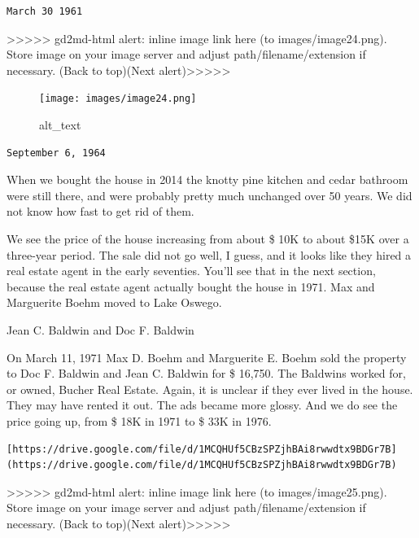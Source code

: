 \documentclass[
  12pt,
]{book}
\begin{document}
\begin{verbatim}
March 30 1961
\end{verbatim}

{\textgreater\textgreater\textgreater\textgreater\textgreater{} gd2md-html alert: inline image link here (to images/image24.png). Store image on your image server and adjust path/filename/extension if necessary. }(Back to top)(Next alert){\textgreater\textgreater\textgreater\textgreater\textgreater{} }

\begin{figure}
\centering
\texttt{[image: images/image24.png]}
\caption{alt\_text}
\end{figure}

\begin{verbatim}
September 6, 1964
\end{verbatim}

When we bought the house in 2014 the knotty pine kitchen and cedar bathroom were still there, and were probably pretty much unchanged over 50 years. We did not know how fast to get rid of them.

We see the price of the house increasing from about \$ 10K to about \$15K over a three-year period. The sale did not go well, I guess, and it looks like they hired a real estate agent in the early seventies. You'll see that in the next section, because the real estate agent actually bought the house in 1971. Max and Marguerite Boehm moved to Lake Oswego.

Jean C. Baldwin and Doc F. Baldwin

On March 11, 1971 Max D. Boehm and Marguerite E. Boehm sold the property to Doc F. Baldwin and Jean C. Baldwin for \$ 16,750. The Baldwins worked for, or owned, Bucher Real Estate. Again, it is unclear if they ever lived in the house. They may have rented it out. The ads became more glossy. And we do see the price going up, from \$ 18K in 1971 to \$ 33K in 1976.

\begin{verbatim}
[https://drive.google.com/file/d/1MCQHUf5CBzSPZjhBAi8rwwdtx9BDGr7B](https://drive.google.com/file/d/1MCQHUf5CBzSPZjhBAi8rwwdtx9BDGr7B)
\end{verbatim}

{\textgreater\textgreater\textgreater\textgreater\textgreater{} gd2md-html alert: inline image link here (to images/image25.png). Store image on your image server and adjust path/filename/extension if necessary. }(Back to top)(Next alert){\textgreater\textgreater\textgreater\textgreater\textgreater{} }
\end{document}

